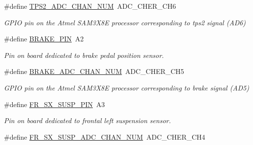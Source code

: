 \begin{DoxyCompactItemize}
\#define \mbox{\hyperlink{group___board__pinout__group_ga4cecb8c10512873904099a1a88d69ed3}{T\+P\+S2\+\_\+\+A\+D\+C\+\_\+\+C\+H\+A\+N\+\_\+\+N\+UM}}~A\+D\+C\+\_\+\+C\+H\+E\+R\+\_\+\+C\+H6
\begin{DoxyCompactList}\small\item\em G\+P\+IO pin on the Atmel S\+A\+M3\+X8E processor corresponding to tps2 signal (A\+D6) \end{DoxyCompactList}\item 
\mbox{\label{group___board__pinout__group_gad632b56bf4c6259a390c3db91607078e}} 
\#define \mbox{\hyperlink{group___board__pinout__group_gad632b56bf4c6259a390c3db91607078e}{B\+R\+A\+K\+E\+\_\+\+P\+IN}}~A2
\begin{DoxyCompactList}\small\item\em Pin on board dedicated to brake pedal position sensor. \end{DoxyCompactList}\item 
\mbox{\label{group___board__pinout__group_ga310547321c4a016c4ad19922920fadfd}} 
\#define \mbox{\hyperlink{group___board__pinout__group_ga310547321c4a016c4ad19922920fadfd}{B\+R\+A\+K\+E\+\_\+\+A\+D\+C\+\_\+\+C\+H\+A\+N\+\_\+\+N\+UM}}~A\+D\+C\+\_\+\+C\+H\+E\+R\+\_\+\+C\+H5
\begin{DoxyCompactList}\small\item\em G\+P\+IO pin on the Atmel S\+A\+M3\+X8E processor corresponding to brake signal (A\+D5) \end{DoxyCompactList}\item 
\mbox{\label{group___board__pinout__group_ga26973930bb94d493970560d50ed5388f}} 
\#define \mbox{\hyperlink{group___board__pinout__group_ga26973930bb94d493970560d50ed5388f}{F\+R\+\_\+\+S\+X\+\_\+\+S\+U\+S\+P\+\_\+\+P\+IN}}~A3
\begin{DoxyCompactList}\small\item\em Pin on board dedicated to frontal left suspension sensor. \end{DoxyCompactList}\item 
\mbox{\label{group___board__pinout__group_ga3582ac3b04abaa9d74b16da2b18a62f9}} 
\#define \mbox{\hyperlink{group___board__pinout__group_ga3582ac3b04abaa9d74b16da2b18a62f9}{F\+R\+\_\+\+S\+X\+\_\+\+S\+U\+S\+P\+\_\+\+A\+D\+C\+\_\+\+C\+H\+A\+N\+\_\+\+N\+UM}}~A\+D\+C\+\_\+\+C\+H\+E\+R\+\_\+\+C\+H4

\end{DoxyCompactItemize}
